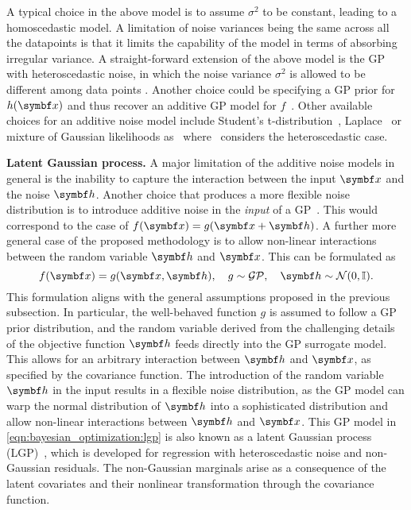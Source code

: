 A typical choice in the above model is to assume $\sigma^2$ to be constant, leading to a homoscedastic model.
A limitation of noise variances being the same across all the datapoints is that it limits the capability of the model in terms of absorbing irregular variance.
A straight-forward extension of the above model is the GP with heteroscedastic noise, in which the noise variance $\sigma^2$ is allowed to be different among data points \parencite{goldberg_regression_1998,lazaro-gredilla_variational_2011}.
Another choice could be specifying a GP prior for $h(\mat{x})$ and thus recover an additive GP model for $f$~\parencite{bernardo_regression_1998,duvenaud_additive_2011}.
Other available choices for an additive noise model include Student's t-distribution~\parencite{jylanki_robust_2011}, Laplace~\parencite{kuss_gaussian_2006} or
mixture of Gaussian likelihoods as~\parencite{kuss_gaussian_2006, stegle_gaussian_2008, naish-guzman_robust_2008} where~\parencite{naish-guzman_robust_2008} considers the heteroscedastic case.

\textbf{Latent Gaussian process.}
A major limitation of the additive noise models in general is the inability to capture the interaction between the input $\mat{x}$ and the noise $\mat{h}$.
Another choice that produces a more flexible noise distribution is to introduce additive noise in the \emph{input} of a GP~\parencite{mchutchon_gaussian_2011,girard_gaussian_2003,girard_approximate_2004}.
This would correspond to the case of $f(\mat{x}) = g(\mat{x} + \mat{h})$.
A further more general case of the proposed methodology is to allow non-linear interactions between the random variable $\mat{h}$ and $\mat{x}$.
This can be formulated as
\begin{equation}
    f(\mat{x}) = g(\mat{x}, \mat{h}),\quad g \sim \mathcal{GP},\quad \mat{h} \sim \mathcal{N}(0, \mathbb{I}). \label{eqn:bayesian_optimization:lgp}
\end{equation}
This formulation aligns with the general assumptions proposed in the previous subsection.
In particular, the well-behaved function $g$ is assumed to follow a GP prior distribution,
and the random variable derived from the challenging details of the objective function $\mat{h}$ feeds directly into the GP surrogate model.
This allows for an arbitrary interaction between $\mat{h}$ and $\mat{x}$, as specified by the covariance function.
The introduction of the random variable $\mat{h}$ in the input results in a flexible noise distribution, as the GP model can warp the normal distribution of $\mat{h}$ into a sophisticated distribution and allow non-linear interactions between $\mat{h}$ and $\mat{x}$.
%
This GP model in \cref{eqn:bayesian_optimization:lgp} is also known as a latent Gaussian process (LGP)~\parencite{pfingsten_nonstationary_2006,wang_gaussian_2012,yousefi_unsupervised_2016,bodin_latent_2017}, which is developed for regression with heteroscedastic noise and non-Gaussian residuals.
The non-Gaussian marginals arise as a consequence of the latent covariates and their nonlinear transformation through the covariance function.

